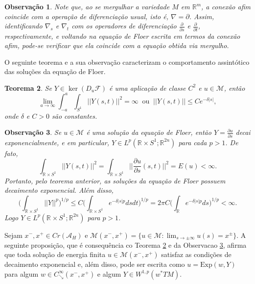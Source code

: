 \documentclass[12pt]{book}
\newtheorem{teorema}{Teorema}[section]
\newtheorem{observacao}[teorema]{Observação}
\newcommand{\bigparenteses}[1]{\Big( #1 \Big) }
\newcommand{\caminhosdecaimentoexponencial}[2]{C^{\infty}_{\searrow}(#1, #2)}
\newcommand{\caminhosdecaimentoexponencialpadrao}{\caminhosdecaimentoexponencial{x^{-}}{x^{+}}}
\newcommand{\circulo}{S^{1}}
\newcommand{\diferencialfloerponto}[1]{D_{#1}\operadorFloer}
\newcommand{\derivadaparcial}[2]{\frac{\partial #1}{\partial #2}}
\newcommand{\energiafinitaM}{\mathcal{M}}
\newcommand{\energiafinitaMconectante}{\energiafinitaM(x^{-}, x^{+})}
\newcommand{\espacoLpcontradominio}[2]{L^{p}(#1;#2)}
\newcommand{\espacosobolev}[1]{W^{1,p}(#1)}
\newcommand{\Exp}{\text{Exp}}
\newcommand{\funcionalH}{\mathcal{A}_{H}}
\newcommand{\operadorFloer}{\mathcal{F}}
\newcommand{\norma}[1]{||#1||}
\newcommand{\normagrande}[1]{\Big|\Big|#1\Big|\Big|}
\newcommand{\normaLpdefinicao}[2]{ \Big(\int_{#2}#1^{p}\Big)^{1/p}}
\newcommand{\pontoscriticos}[1]{\textit{Cr}(#1)}
\newcommand{\pullbackfibradotangente}[2]{#1^{*}T#2}
\newcommand{\pullbackfibradotangenteM}[1]{\pullbackfibradotangente{#1}{M}}
\newcommand{\retacartesianocirculo}{\real{} \times \circulo}
\newcommand{\real}[1]{\mathbb{R}^{#1}}
\newcommand{\reta}{\real{}}
\begin{document}
	\begin{observacao}
		Note que, ao se mergulhar a variedade $M$ em $\real{m}$, a conexão afim coincide com a operação de diferenciação usual, isto é,  $\nabla=\partial$. Assim, identificando $\nabla_{s}$ e $\nabla_{t}$ com os operadores de diferenciação $\derivadaparcial{}{s}$ e $\derivadaparcial{}{t}$, respectivamente, e voltando na equação de Floer escrita em termos da conexão afim, pode-se verificar que ela coincide com a equação obtida via mergulho.
	\end{observacao}
	
	O seguinte teorema e a sua observação caracterizam o comportamento assintótico das soluções da equação de Floer.
	
	\begin{teorema}\label{teorema_decaimento_exponencial_solucao_floer}
		Se $Y \in \ker(\diferencialfloerponto{u})$ é uma aplicação de classe $C^{2}$ e $u \in \energiafinitaM$, então 
		$$
		\lim\limits_{a\to \infty}\int_{-a}^{a}\int_{\circulo}\norma{Y(s,t)}^{2} = \infty \;\;\text{ou}\;\; \norma{Y(s,t)} \leq Ce^{-\delta|s|},
		$$
		onde $\delta$ e $C>0$ são constantes.
	\end{teorema}
	
	\begin{observacao}\label{observacao_decaimento_exponencial_solucao_floer}
		Se $u \in \energiafinitaM$ é uma solução da equação de Floer, então $Y=\derivadaparcial{u}{s}$ decai exponencialmente, e em particular, $Y \in \espacoLpcontradominio{\retacartesianocirculo}{\real{2n}}$ para cada $p>1$. De fato, 
		$$
		\int_{\retacartesianocirculo}\normagrande{Y(s,t)}^{2} = \int_{\retacartesianocirculo}\normagrande{\derivadaparcial{u}{s}(s,t) }^{2}=E(u)<\infty.
		$$
		Portanto, pelo teorema anterior, as soluções da equação de Floer possuem decaimento exponencial. Além disso, 
		$$
		\normaLpdefinicao{\norma{Y}}{\retacartesianocirculo} \leq C\bigparenteses{\int_{\retacartesianocirculo}e^{-\delta|s|p}dsdt}^{1/p} = 2\pi C\bigparenteses{\int_{\reta}e^{-\delta|s|p}ds }^{1/p}<\infty.
		$$ 
		Logo $Y \in \espacoLpcontradominio{\retacartesianocirculo}{\real{2n}}$ para $p>1$.
	\end{observacao}
	Sejam $x^{-}, x^{+} \in \pontoscriticos{\funcionalH}$ e $\energiafinitaMconectante =\{u\in \energiafinitaM: \lim_{s\to \pm \infty}u(s) =x^{\pm}\}$.
	A seguinte proposição, que é consequência co Teorema \ref{teorema_decaimento_exponencial_solucao_floer} e da Observacao \ref{observacao_decaimento_exponencial_solucao_floer}, afirma que toda solução de energia finita $u \in \energiafinitaMconectante$ satisfaz as condições de decaimento exponencial e, além disso, pode ser escrita como $u=\Exp(w,Y)$ para algum $w\in \caminhosdecaimentoexponencialpadrao$ e algum $Y\in \espacosobolev{\pullbackfibradotangenteM{w}}$.
	
\end{document}
